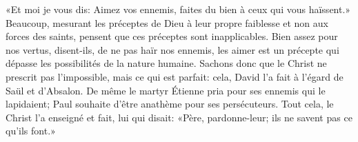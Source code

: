 «Et moi je vous dis: Aimez vos ennemis, faites du bien à ceux qui vous haïssent.»
Beaucoup, mesurant les préceptes de Dieu à leur propre faiblesse
		et non aux forces des saints,
	pensent que ces préceptes sont inapplicables.
Bien assez pour nos vertus, disent-ils, de ne pas haïr nos ennemis,
	les aimer est un précepte qui dépasse les possibilités de la nature humaine.
Sachons donc que le Christ ne prescrit pas l'impossible, mais ce qui est parfait:
	cela, David l'a fait à l'égard de Saül et d'Absalon.
De même le martyr Étienne pria pour ses ennemis qui le lapidaient;
	Paul souhaite d'être anathème pour ses persécuteurs.
Tout cela, le Christ l'a enseigné et fait, lui qui disait:
	«Père, pardonne-leur; ils ne savent pas ce qu'ils font.»
